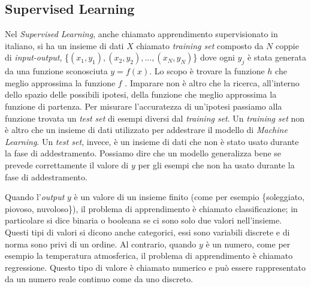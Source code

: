 \documentclass[12pt,italian]{report}
\begin{document}
	\subsection{Supervised Learning}
	\label{SupervisedLearning}
	Nel \textit{Supervised Learning}, anche chiamato apprendimento supervisionato in italiano, si ha un insieme di dati $X$ chiamato \textit{training set} composto da $N$ coppie di \textit{input-output}, \{$(x_1, y_1), (x_2, y_2),...,(x_N, y_N)$\} dove ogni $y_j$ è stata generata da una funzione sconosciuta $y=f(x)$. Lo scopo è trovare la funzione $h$ che meglio approssima la funzione $f$ \cite{russell2010artificial}.
	Imparare non è altro che la ricerca, all'interno dello spazio delle possibili ipotesi, della funzione che meglio approssima la funzione di partenza. Per misurare l'accuratezza di un'ipotesi passiamo alla funzione trovata un \textit{test set} di esempi diversi dal \textit{training set}. Un \textit{training set} non è altro che un insieme di dati utilizzato per addestrare il modello di \textit{Machine Learning}. Un \textit{test set}, invece, è un insieme di dati che non è stato usato durante la fase di addestramento. Possiamo dire che un modello generalizza bene se prevede correttamente il valore di $y$ per gli esempi che non ha usato durante la fase di addestramento.
	
	Quando l'\textit{output} $y$ è un valore di un insieme finito (come per esempio \{soleggiato, piovoso, nuvoloso\}), il problema di apprendimento è chiamato classificazione; in particolare si dice binaria o booleana se ci sono solo due valori nell'insieme. Questi tipi di valori si dicono anche categorici, essi sono variabili discrete e di norma sono privi di un ordine.
	Al contrario, quando $y$ è un numero, come per esempio la temperatura atmosferica, il problema di apprendimento è chiamato regressione. Questo tipo di valore è chiamato numerico e può essere rappresentato da un numero reale continuo come da uno discreto.
	
\end{document}
